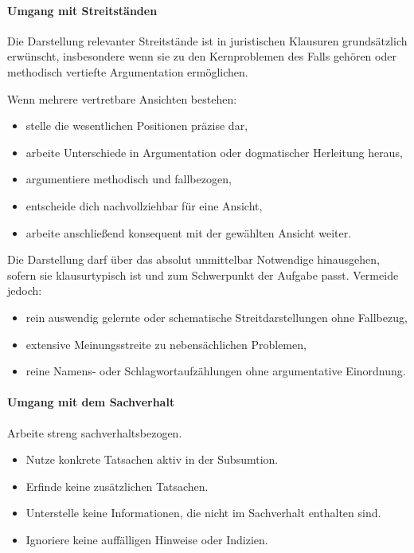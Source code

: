 \documentclass[11pt]{article}
\providecommand{\tightlist}{%
  \setlength{\itemsep}{0pt}\setlength{\parskip}{0pt}}
\begin{document}
\paragraph{Umgang mit Streitständen}\label{umgang-mit-streitstuxe4nden}

Die Darstellung relevanter Streitstände ist in juristischen Klausuren
grundsätzlich erwünscht, insbesondere wenn sie zu den Kernproblemen des
Falls gehören oder methodisch vertiefte Argumentation ermöglichen.

Wenn mehrere vertretbare Ansichten bestehen:

\begin{itemize}
\tightlist
\item
  stelle die wesentlichen Positionen präzise dar,
\item
  arbeite Unterschiede in Argumentation oder dogmatischer Herleitung
  heraus,
\item
  argumentiere methodisch und fallbezogen,
\item
  entscheide dich nachvollziehbar für eine Ansicht,
\item
  arbeite anschließend konsequent mit der gewählten Ansicht weiter.
\end{itemize}

Die Darstellung darf über das absolut unmittelbar Notwendige
hinausgehen, sofern sie klausurtypisch ist und zum Schwerpunkt der
Aufgabe passt. Vermeide jedoch:

\begin{itemize}
\tightlist
\item
  rein auswendig gelernte oder schematische Streitdarstellungen ohne
  Fallbezug,
\item
  extensive Meinungsstreite zu nebensächlichen Problemen,
\item
  reine Namens- oder Schlagwortaufzählungen ohne argumentative
  Einordnung.
\end{itemize}

\paragraph{\texorpdfstring{\textbf{Umgang mit dem
Sachverhalt}}{Umgang mit dem Sachverhalt}}\label{umgang-mit-dem-sachverhalt}

Arbeite streng sachverhaltsbezogen.

\begin{itemize}
\tightlist
\item
  Nutze konkrete Tatsachen aktiv in der Subsumtion.
\item
  Erfinde keine zusätzlichen Tatsachen.
\item
  Unterstelle keine Informationen, die nicht im Sachverhalt enthalten
  sind.
\item
  Ignoriere keine auffälligen Hinweise oder Indizien.
\end{itemize}
\end{document}

